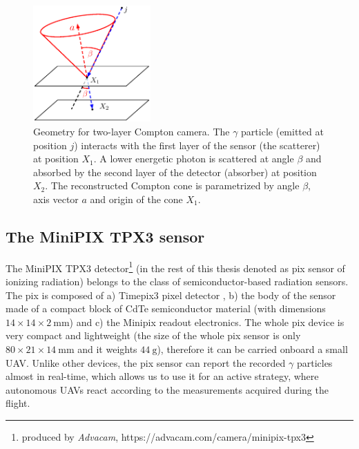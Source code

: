 \begin{figure}[!h]
  \centering
    \includegraphics[width=0.4\textwidth]{./fig/photos/compton_camera_modelll.eps}
    \caption{Geometry for two-layer Compton camera. The $\gamma$ particle (emitted at position $j$) interacts with the first layer of the sensor (the scatterer) at position $X_{1}$. A lower energetic photon is scattered at angle $\beta$ and absorbed by the second layer of the detector (absorber) at position $X_{2}$. The reconstructed Compton cone is parametrized by angle $\beta$, axis vector $a$ and origin of the cone $X_{1}$.}
    \label{fig:compton_camera_geometry}
\end{figure}

\subsection{The MiniPIX TPX3 sensor} %
The MiniPIX TPX3 detector\footnote{produced by \textit{Advacam}, https://advacam.com/camera/minipix-tpx3} (in the rest of this thesis denoted as \ac{pix} sensor of ionizing radiation) belongs to the class of semiconductor-based radiation sensors.
The \ac{pix} is composed of a) Timepix3 pixel detector \cite{timepix3},
b) the body of the sensor made of a compact block of \ac{CdTe} semiconductor material (with dimensions $14 \times 14 \times 2 \ \si{\milli\meter}$) 
and c) the Minipix readout electronics.
The whole \ac{pix} device is very compact and lightweight (the size of the whole \ac{pix} sensor is only $80 \times 21 \times 14 \ \si{\milli\meter}$ and it weights $\SI{44}{\gram}$), therefore it can be carried onboard a small \ac{UAV}.
Unlike other devices, the \ac{pix} sensor can report the recorded $\gamma$ particles almost in real-time, which allows us to use it for an active strategy, where autonomous \ac{UAV}s react according to the measurements acquired during the flight.

